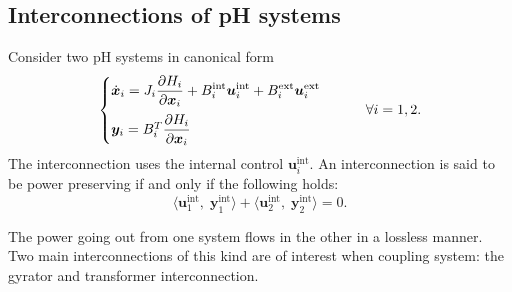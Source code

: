 \subsection{Interconnections of pH systems}
Consider two pH systems in canonical form
\begin{equation}
\begin{cases}
\dot{\bm{x}}_i = {J}_i \displaystyle\diffp{H_i}{\bm{x}_i} + {B}_i^{\text{int}} \bm{u}_i^{\text{int}} + {B}_i^{\text{ext}} \bm{u}_i^{\text{ext}}  \vspace{2mm} \\
\bm{y}_i = {B}_i^T  \displaystyle\diffp{H_i}{\bm{x}_i}
\end{cases} \qquad \forall i = 1, 2.
\end{equation}
The interconnection uses the internal control $\bm{u}_i^{\text{int}}$. An interconnection is said to be power preserving if and only if the following holds:
\begin{equation} \label{eq:int_balance}
\langle \bm{u}_1^{\text{int}}, \; \bm{y}_1^{\text{int}} \rangle + \langle \bm{u}_2^{\text{int}}, \; \bm{y}_2^{\text{int}} \rangle = 0.
\end{equation}

The power going out from one system flows in the other in a lossless manner. Two main interconnections of this kind are of interest when coupling system: the gyrator and transformer interconnection.

